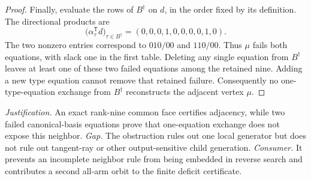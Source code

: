\documentclass{article}
\begin{document}
\begin{proof}
Finally, evaluate the rows of \(B^\dagger\) on \(d\), in the order fixed by its definition. The directional products are
\[\bigl(\alpha_\tau^{\mathsf T}d\bigr)_{\tau\in B^\dagger}=(0,0,0,1,0,0,0,0,1,0).\]
The two nonzero entries correspond to \(010/00\) and \(110/00\). Thus \(\mu\) fails both equations, with slack one in the first table. Deleting any single equation from \(B^\dagger\) leaves at least one of these two failed equations among the retained nine. Adding a new type equation cannot remove that retained failure. Consequently no one-type-equation exchange from \(B^\dagger\) reconstructs the adjacent vertex \(\mu\).
\end{proof}
\par\smallskip\noindent \textit{Justification.} An exact rank-nine common face certifies adjacency, while two failed canonical-basis equations prove that one-equation exchange does not expose this neighbor. \textit{Gap.} The obstruction rules out one local generator but does not rule out tangent-ray or other output-sensitive child generation. \textit{Consumer.} It prevents an incomplete neighbor rule from being embedded in reverse search and contributes a second all-arm orbit to the finite deficit certificate.
\end{document}
